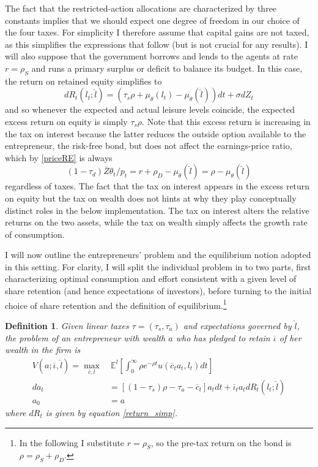 \documentclass[11pt]{article}
\theoremstyle{plain}
\newtheorem{defn}{Definition}[section]
\begin{document}
The fact that the restricted-action allocations are characterized by three constants implies that we should expect one degree of freedom in our choice of the four taxes. For simplicity I therefore assume that capital gains are not taxed, as this simplifies the expressions that follow (but is not crucial for any results). I will also suppose that the government borrows and lends to the agents at rate $r = \rho_S$ and runs a primary surplus or deficit to balance its budget. In this case, the return on retained equity simplifies to
\begin{equation}
dR_t(l_t;\hat{l}) = (\tau_s \rho + \mu_{\theta}(l_t) - \mu_{\theta}(\hat{l}))dt + \sigma dZ_t
\label{return_simp}
\end{equation}
and so whenever the expected and actual leisure levels coincide, the expected excess return on equity is simply $\tau_s \rho$. Note that this excess return is increasing in the tax on interest because the latter reduces the outside option available to the entrepreneur, the risk-free bond, but does not affect the earnings-price ratio, which by \eqref{priceRE} is always 
$$ %
(1-\tau_d)\overline{Z}\theta_t/p_t = r + \rho_D - \mu_{\theta}(\hat{l}) = \rho - \mu_{\theta}(\hat{l})
$$
regardless of taxes. The fact that the tax on interest appears in the excess return on equity but the tax on wealth does not hints at why they play conceptually distinct roles in the below implementation. The tax on interest alters the relative returns on the two assets, while the tax on wealth simply affects the growth rate of consumption. 


I will now outline the entrepreneurs' problem and the equilibrium notion adopted in this setting. For clarity, I will split the individual problem in to two parts, first characterizing optimal consumption and effort consistent with a given level of share retention (and hence expectations of investors), before turning to the initial choice of share retention and the definition of equilibrium.\footnote{In the following I substitute $r = \rho_S$, so the pre-tax return on the bond is $\rho = \rho_S + \rho_D$.}

\begin{defn}  \label{conPROBlin2}
Given linear taxes $\tau = (\tau_s,\tau_a)$ and expectations governed by $\hat{l}$, the problem of an entrepreneur with wealth $a$ who has pledged to retain $\overline{\iota}$ of her wealth in the firm is
\begin{align*}
V(a; \overline{\iota}, \hat{l}) = \max_{\overline{c},l} & \ \mathbb{E}^l{\left[\int_{0}^{\infty}\rho e^{-\rho t}u(\overline{c}_ta_t,l_t)dt\right]}
\\ da_t & = [(1-\tau_s)\rho - \tau_a - \overline{c}_t]a_tdt + \overline{\iota}_t a_tdR_t(l_t;\hat{l})
\\ a_0 & = a
\end{align*}
where $dR_t$ is given by equation \eqref{return_simp}. 
\end{defn}
\end{document}
